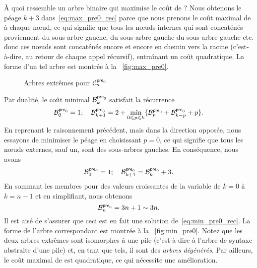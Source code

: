 À quoi ressemble un arbre binaire qui maximise le coût de
? Nous obtenons le
péage \(k+3\) dans~\eqref{eq:max_pre0_rec} parce que nous prenons le
coût maximal de  à chaque nœud,
ce qui signifie que tous les nœuds internes qui sont concaténés
proviennent du sous-arbre gauche, du sous-arbre gauche du sous-arbre
gauche etc. donc ces nœuds sont concaténés encore et encore en
chemin vers la racine (c'est-à-dire, au retour de chaque appel
récursif), entraînant un coût quadratique. La forme d'un tel arbre est
montrée à la \fig~\vref{fig:max_pre0}.
\begin{figure}
\centering
{}
\qquad
{}
\caption{Arbres extrêmes pour \(\C{\fun{pre}_0}{n}\)}
\label{fig:tree_stack}
\end{figure}

Par dualité, le coût minimal
\(\B{\fun{pre}_0}{k}\) satisfait la
récurrence
\begin{equation*}
\B{\fun{pre}_0}{0} = 1;\quad
\B{\fun{pre}_0}{k+1} =
  2 + \min_{0 \leqslant p \leqslant k}\{\B{\fun{pre}_0}{p}
                                  + \B{\fun{pre}_0}{k-p} + p\}.
\end{equation*}
En reprenant le raisonnement précédent, mais dans la direction
opposée, nous essayons de minimiser le péage en choisissant \(p=0\),
ce qui signifie que tous les nœuds externes, sauf un, sont des
sous-arbres gauches. En conséquence, nous avons
\begin{equation}
\B{\fun{pre}_0}{0} = 1;\quad
\B{\fun{pre}_0}{k+1} = \B{\fun{pre}_0}{k} + 3.
\label{eq:min_pre0_rec}
\end{equation}
En sommant les membres pour des valeurs croissantes de la variable de
\(k=0\) à \(k=n-1\) et en simplifiant, nous obtenons
\begin{equation*}
\B{\fun{pre}_0}{n} = 3n + 1 \sim 3n.
\end{equation*}
Il est aisé de s'assurer que ceci est en fait une solution
de~\eqref{eq:min_pre0_rec}. La forme de l'arbre correspondant est
montrée à la \fig~\vref{fig:min_pre0}. Notez que les deux arbres
extrêmes sont isomorphes à une pile (c'est-à-dire à l'arbre de syntaxe
abstraite d'une pile) et, en
tant que tels, il sont des \emph{arbres dégénérés}. Par ailleurs, le coût maximal de
 est quadratique, ce
qui nécessite une amélioration.

